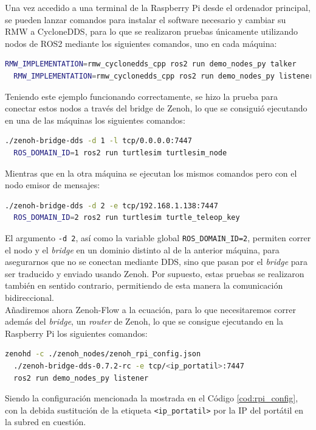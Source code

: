 Una vez accedido a una terminal de la Raspberry Pi desde el ordenador principal,
se pueden lanzar comandos para instalar el software necesario y cambiar su RMW a
CycloneDDS, para lo que se realizaron pruebas únicamente utilizando nodos de
ROS2 mediante los siguientes comandos, uno en cada máquina:
\begin{lstlisting}[language=bash]
  RMW_IMPLEMENTATION=rmw_cyclonedds_cpp ros2 run demo_nodes_py talker
  RMW_IMPLEMENTATION=rmw_cyclonedds_cpp ros2 run demo_nodes_py listener
\end{lstlisting}

Teniendo este ejemplo funcionando correctamente, se hizo la prueba para conectar
estos nodos a través del bridge de Zenoh, lo que se consiguió ejecutando en una
de las máquinas los siguientes comandos:
\begin{lstlisting}[language=bash]
  ./zenoh-bridge-dds -d 1 -l tcp/0.0.0.0:7447
  ROS_DOMAIN_ID=1 ros2 run turtlesim turtlesim_node
\end{lstlisting}

Mientras que en la otra máquina se ejecutan los mismos comandos pero con el nodo
emisor de mensajes:
\begin{lstlisting}[language=bash]
  ./zenoh-bridge-dds -d 2 -e tcp/192.168.1.138:7447
  ROS_DOMAIN_ID=2 ros2 run turtlesim turtle_teleop_key
\end{lstlisting}

El argumento \verb|-d 2|, así como la variable global \verb|ROS_DOMAIN_ID=2|,
permiten correr el nodo y el \textit{bridge} en un dominio distinto al de la
anterior máquina, para asegurarnos que no se conectan mediante DDS, sino que
pasan por el \textit{bridge} para ser traducido y enviado usando Zenoh.
Por supuesto, estas pruebas se realizaron también en sentido contrario,
permitiendo de esta manera la comunicación bidireccional.
\\

Añadiremos ahora Zenoh-Flow a la ecuación, para lo que necesitaremos correr
además del \textit{bridge}, un \textit{router} de Zenoh, lo que se consigue
ejecutando en la Raspberry Pi los siguientes comandos:
\begin{lstlisting}[language=bash]
  zenohd -c ./zenoh_nodes/zenoh_rpi_config.json
  ./zenoh-bridge-dds-0.7.2-rc -e tcp/<ip_portatil>:7447
  ros2 run demo_nodes_py listener
\end{lstlisting}

Siendo la configuración mencionada la mostrada en el Código
\ref{cod:rpi_config}, con la debida sustitución de la etiqueta
\verb|<ip_portatil>| por la IP del portátil en la subred en cuestión.
\\

